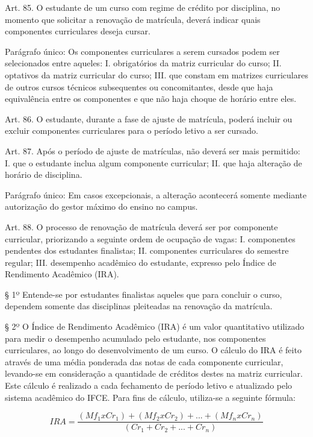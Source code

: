 \documentclass{paper}
\begin{document}
Art. 85. O estudante de um curso com regime de crédito por disciplina, no momento que solicitar a renovação de matrícula, deverá indicar quais componentes curriculares deseja cursar.

Parágrafo único: Os componentes curriculares a serem cursados podem ser selecionados entre aqueles:
I. obrigatórios da matriz curricular do curso;
II. optativos da matriz curricular do curso;
III. que constam em matrizes curriculares de outros cursos técnicos subsequentes ou concomitantes, desde que haja equivalência entre os componentes e que não haja choque de horário entre eles.

Art. 86. O estudante, durante a fase de ajuste de matrícula, poderá incluir ou excluir componentes curriculares para o período letivo a ser cursado.

Art. 87. Após o período de ajuste de matrículas, não deverá ser mais permitido:
I. que o estudante inclua algum componente curricular;
II. que haja alteração de horário de disciplina.

Parágrafo único: Em casos excepcionais, a alteração acontecerá somente mediante autorização do gestor máximo do ensino no campus.

Art. 88. O processo de renovação de matrícula deverá ser por componente curricular, priorizando a seguinte ordem de ocupação de vagas:
I. componentes pendentes dos estudantes finalistas;
II. componentes curriculares do semestre regular;
III. desempenho acadêmico do estudante, expresso pelo Índice de Rendimento Acadêmico (IRA).

§ 1º Entende-se por estudantes finalistas aqueles que para concluir o curso, dependem somente das disciplinas pleiteadas na renovação da matrícula.

§ 2º O Índice de Rendimento Acadêmico (IRA) é um valor quantitativo utilizado para medir o desempenho acumulado pelo estudante, nos componentes curriculares, ao longo do desenvolvimento de um curso. O cálculo do IRA é feito através de uma média ponderada das notas de cada componente curricular, levando-se em consideração a quantidade de créditos destes na matriz curricular. Este cálculo é realizado a cada fechamento de período letivo e atualizado pelo sistema acadêmico do IFCE. Para fins de cálculo, utiliza-se a seguinte fórmula:

\begin{equation*}
IRA=\frac{(Mf_1 x Cr_1)+(Mf_2 x Cr_2)+...+(Mf_n x Cr_n)}{(Cr_1+Cr_2+...+Cr_n)}
\end{equation*}
\vspace{0,3cm}
\end{document}
